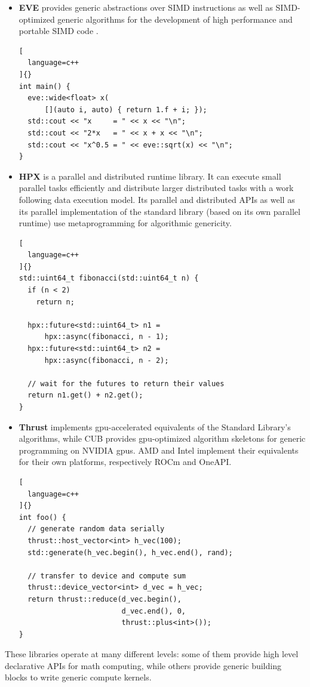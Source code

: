 \documentclass[../main]{subfiles}
\begin{document}
\begin{itemize}
\begin{lstlisting}[
  language=c++
]{}
int main() {
  table<double> x;
  table<double> y = ones(4, 4);

  x = 40.0 * y + 2.0;

  NT2_DISPLAY(x);
}
\end{lstlisting}

  \item

\textbf{EVE} \cite{eve} provides generic abstractions over SIMD instructions
as well as SIMD-optimized generic algorithms for the development of
high performance and portable SIMD code \cite{hpcs2018-matvec}.

\begin{lstlisting}[
  language=c++
]{}
int main() {
  eve::wide<float> x(
      [](auto i, auto) { return 1.f + i; });
  std::cout << "x     = " << x << "\n";
  std::cout << "2*x   = " << x + x << "\n";
  std::cout << "x^0.5 = " << eve::sqrt(x) << "\n";
}
\end{lstlisting}

  \item

\textbf{HPX} \cite{hpx} is a \cpp parallel and distributed runtime library.
It can execute small parallel tasks efficiently and distribute
larger distributed tasks with a work following data execution model.
Its parallel and distributed APIs as well as its parallel implementation of
the standard library (based on its own parallel runtime) use metaprogramming
for algorithmic genericity.

\begin{lstlisting}[
  language=c++
]{}
std::uint64_t fibonacci(std::uint64_t n) {
  if (n < 2)
    return n;

  hpx::future<std::uint64_t> n1 =
      hpx::async(fibonacci, n - 1);
  hpx::future<std::uint64_t> n2 =
      hpx::async(fibonacci, n - 2);

  // wait for the futures to return their values
  return n1.get() + n2.get();
}
\end{lstlisting}

  \item

\textbf{Thrust} \cite{thrust} implements \gls{gpu}-accelerated equivalents
of the Standard Library's algorithms, while CUB \cite{cub} provides
\gls{gpu}-optimized algorithm skeletons for generic programming on NVIDIA
\glspl{gpu}.
AMD and Intel implement their equivalents for their own platforms, respectively
ROCm and OneAPI.

\begin{lstlisting}[
  language=c++
]{}
int foo() {
  // generate random data serially
  thrust::host_vector<int> h_vec(100);
  std::generate(h_vec.begin(), h_vec.end(), rand);

  // transfer to device and compute sum
  thrust::device_vector<int> d_vec = h_vec;
  return thrust::reduce(d_vec.begin(),
                        d_vec.end(), 0,
                        thrust::plus<int>());
}
\end{lstlisting}

\end{itemize}

These libraries operate at many different levels: some of them provide
high level declarative APIs for math computing, while others provide generic
building blocks to write generic compute kernels.
\end{document}
